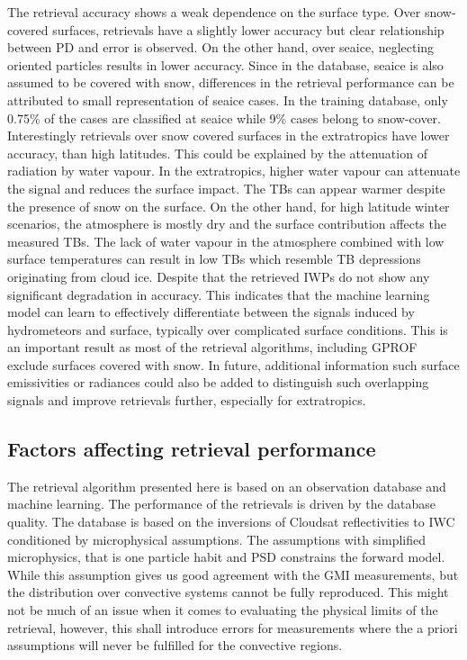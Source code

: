 \documentclass[amt, manuscript]{copernicus}
\begin{document}
The retrieval accuracy shows a weak dependence on the surface type. Over snow-covered surfaces, retrievals have a slightly lower accuracy but clear relationship between PD and error is observed. On the other hand, over seaice, neglecting oriented particles results in lower accuracy. Since in the database, seaice is also assumed to be covered with snow, differences in the retrieval performance can be attributed to small representation of seaice cases. In the training database, only 0.75\% of the cases are classified at seaice while 9\% cases belong to snow-cover. Interestingly retrievals over snow covered surfaces in the extratropics have lower accuracy, than high latitudes. This could be explained by the attenuation of radiation by water vapour. In the extratropics, higher water vapour can attenuate the signal and reduces the surface impact. The TBs can appear warmer despite the presence of snow on the surface.  On the other hand, for high latitude winter scenarios, the atmosphere is mostly dry and the surface contribution affects the measured TBs. The lack of water vapour in the atmosphere combined with low surface temperatures can result in low TBs which resemble TB depressions originating from cloud ice. Despite that the retrieved IWPs do not show any significant degradation in accuracy. This indicates that the machine learning model can learn to effectively differentiate between the signals induced by hydrometeors and surface, typically over complicated surface conditions. This is an important result as most of the retrieval algorithms, including GPROF exclude surfaces covered with snow. In future, additional information such  surface emissivities or radiances could also be added to distinguish such overlapping signals and improve retrievals further, especially for extratropics.  


\subsection{Factors affecting retrieval performance}
%
The retrieval algorithm presented here is based on an observation database and machine learning. The performance of the retrievals is driven by the database quality. The database is based on the inversions of Cloudsat reflectivities to IWC conditioned by microphysical assumptions. The assumptions with simplified microphysics, that is one particle habit and PSD constrains the forward model. While this assumption gives us good agreement with the GMI measurements, but the distribution over convective systems cannot be fully reproduced. This might not be much of an issue when it comes to evaluating the physical limits of the retrieval, however, this shall introduce errors for measurements where the a priori assumptions will never be fulfilled for the convective regions.
\end{document}
